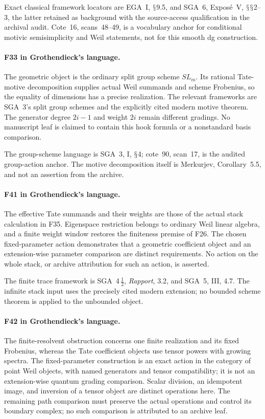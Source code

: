 \documentclass[11pt,a4paper]{article}
\renewcommand{\S}{\ensuremath{\mathsection}}
\newcommand{\fid}[1]{\textsf{#1}}\newcommand{\gate}[1]{\textsf{#1}}
\theoremstyle{named}\newtheorem{finding}{Finding}[section]
\theoremstyle{definition}\newtheorem{definition}[finding]{Definition}
\theoremstyle{remark}\newtheorem{remark}[finding]{Remark}
\begin{document}
Exact classical framework locators are EGA~I, \S9.5, and SGA~6, Expos\'e~V, \S\S2--3, the latter retained as background with the source-access qualification in the archival audit. Cote~16, scans~48--49, is a vocabulary anchor for conditional motivic semisimplicity and Weil statements, not for this smooth dg construction.


\paragraph{\fid{F33} in Grothendieck's language.}
The geometric object is the ordinary split group scheme $SL_m$.
Its rational Tate-motive decomposition supplies actual Weil
summands and scheme Frobenius, so the equality of dimensions
has a precise realization. The relevant frameworks are SGA~3's
split group schemes and the explicitly cited modern motive
theorem. The generator degree $2i-1$ and weight $2i$ remain
different gradings. No manuscript leaf is claimed to contain
this hook formula or a nonstandard basis comparison.


The group-scheme language is SGA~3, I, \S4; cote~90, scan~17, is the audited group-action anchor. The motive decomposition itself is Merkurjev, Corollary~5.5, and not an assertion from the archive.


\paragraph{\fid{F41} in Grothendieck's language.}
The effective Tate summands and their weights are those of the
actual stack calculation in \fid{F35}. Eigenspace restriction
belongs to ordinary Weil linear algebra, and a finite weight
window restores the finiteness premise of \fid{F26}.
The chosen fixed-parameter action demonstrates that a geometric
coefficient object and an extension-wise parameter comparison
are distinct requirements. No action on the whole stack, or
archive attribution for such an action, is asserted.

The finite trace framework is SGA~4\,$\frac12$, \emph{Rapport}, 3.2, and SGA~5, III, 4.7. The infinite stack input uses the precisely cited modern extension; no bounded scheme theorem is applied to the unbounded object.


\paragraph{\fid{F42} in Grothendieck's language.}
The finite-resolvent obstruction concerns one finite realization
and its fixed Frobenius, whereas the Tate coefficient objects
use tensor powers with growing spectra. The fixed-parameter
construction is an exact action in the category of point Weil
objects, with named generators and tensor compatibility; it is
not an extension-wise quantum grading comparison. Scalar
division, an idempotent image, and inversion of a tensor object
are distinct operations here. The remaining path comparison
must preserve the actual operations and control its boundary
complex; no such comparison is attributed to an archive leaf.
\end{document}
